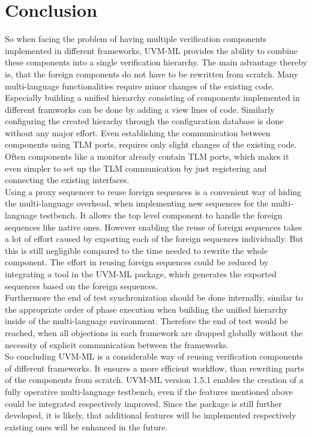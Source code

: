 \section{Conclusion}\label{conclusion}
So when facing the problem of having multiple verification components implemented in different frameworks, UVM-ML provides the ability to combine these components into a single verification hierarchy. The main advantage thereby is, that the foreign components do not have to be rewritten from scratch. Many multi-language functionalities require minor changes of the existing code. Especially building a unified hierarchy consisting of components implemented in different framworks can be done by adding a view lines of code. Similarly configuring the created hierachy through the configuration database is done without any major effort. Even establishing the communication between components using TLM ports, requires only slight changes of the existing code. Often components like a monitor already contain TLM ports, which makes it even simpler to set up the TLM communication by just registering and connecting the existing interfaces.\\
Using a proxy sequencer to reuse foreign sequences is a convenient way of hiding the multi-language overhead, when implementing new sequences for the multi-language testbench. It allows the top level component to handle the foreign sequences like native ones. However enabling the reuse of foreign sequences takes a lot of effort caused by exporting each of the foreign sequences individually. But this is still negligible compared to the time needed to rewrite the whole component. The effort in reusing foreign sequences could be reduced by integrating a tool in the UVM-ML package, which generates the exported sequences based on the foreign sequences.\\
Furthermore the end of test synchronization should be done internally, similar to the appropriate order of phase execution when building the unified hierarchy inside of the multi-language environment. Therefore the end of test would be reached, when all objections in each framework are dropped globally without the necessity of explicit communication between the frameworks.\\
So concluding UVM-ML is a considerable way of reusing verification components of different frameworks. It ensures a more efficient workflow, than rewriting parts of the components from scratch. UVM-ML version 1.5.1 enables the creation of a fully operative multi-language testbench, even if the features mentioned above could be integrated respectively improved.
Since the package is still further developed, it is likely, that additional features will be implemented respectively existing ones will be enhanced in the future.